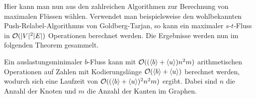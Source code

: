 Hier kann man nun aus den zahlreichen Algorithmen zur Berechnung von maximalen Flüssen wählen.
Verwendet man beispielsweise den wohlbekannten Push-Relabel-Algorithmus von Goldberg-Tarjan,  so kann ein maximaler $s$-$t$-Fluss in $\mathcal{O}(\lvert V\rvert^2\lvert E\rvert)$ Operationen berechnet werden.
Die Ergebnisse werden nun im folgenden Theorem gesammelt.

\begin{theorem}\label{thm-compute-minimal-con-flow}
	Ein auslastungsminimaler $b$-Fluss kann mit $\mathcal{O}((\langle b\rangle+\langle u\rangle) n^2 m)$ arithmetischen Operationen auf Zahlen mit Kodierungslänge $\mathcal{O}(\langle b\rangle + \langle u\rangle)$ berechnet werden, wodurch sich eine Laufzeit von $\mathcal{O}((\langle b\rangle+\langle u\rangle)^2 n^2 m)$ ergibt.
	Dabei sind $n$ die Anzahl der Knoten und $m$ die Anzahl der Kanten im Graphen.
\end{theorem}
